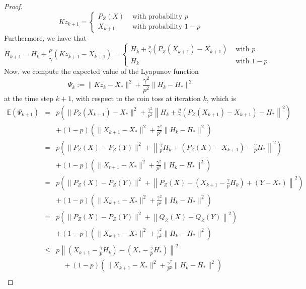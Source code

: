 \begin{itemize}
\begin{proof}
\begin{equation}
Kz_{k+1} = \left \{ \begin{array}{ll} P_Z(X) & \mbox{ with probability } p \\ X_{k+1} & \mbox{ with probability } 1 - p \end{array}  \right. 
\end{equation}
Furthermore, we have that 
\begin{equation}
H_{k+1} = H_k + \frac{p}{\gamma} (Kz_{k+1} - X_{k+1}) = 
\left \{ \begin{array}{ll} 
H_k + \frac{p}{\gamma} \left ( P_Z(X_{k+1}) - X_{k+1} \right ) & \mbox{ with  } p \\ H_k & \mbox{ with } 1 - p \end{array}  \right. 
\end{equation}
Now, we compute the expected value of the Lyapunov function 
\begin{equation}
\Psi_k := \|Kz_k - X_*\|^2 + \frac{\gamma^2}{p^2} \|H_k - H_*\|^2 
\end{equation}
at the time step $k+1$, with respect to the coin toss at iteration $k$, which is 
\begin{eqnarray}
\mathbb{E}(\Psi_{k+1}) &=& p \left ( \|P_Z(X_{k+1}) - X_*\|^2 + \frac{\gamma^2}{p^2} \left \|H_k + \frac{p}{\gamma} (P_Z(X_{k+1}) - X_{k+1})  - H_* \right \|^2 \right ) \\
&& + (1-p) \left ( \|X_{k+1} - X_*\|^2 + \frac{\gamma^2}{p^2} \|H_k - H_*\|^2  \right ) \\
&=& p \left ( \|P_Z(X) - P_Z(Y) \|^2 + \left \| \frac{\gamma}{p} H_k + (P_Z(X) - X_{k+1})  - \frac{\gamma}{p} H_* \right \|^2 \right ) \\
&& + (1-p) \left ( \|X_{t+1} - X_*\|^2 + \frac{\gamma^2}{p^2} \|H_k - H_*\|^2  \right ) \\
&=& p \left ( \|P_Z(X) - P_Z(Y) \|^2 + \left \|P_Z(X) - (X_{k+1} - \frac{\gamma}{p} H_k )  + (Y - X_*) \right \|^2 \right ) \\
&& + (1-p) \left ( \|X_{k+1} - X_*\|^2 + \frac{\gamma^2}{p^2} \|H_k - H_*\|^2  \right ) \\
&=& p \left ( \|P_Z(X) - P_Z(Y) \|^2 + \left \|Q_Z(X) - Q_Z(Y) \right \|^2 \right ) \\
&& + (1-p) \left ( \|X_{k+1} - X_*\|^2 + \frac{\gamma^2}{p^2} \|H_k - H_*\|^2  \right ) \\
&\leq& p \left \|\left ( X_{k+1} - \frac{\gamma}{p} H_k \right ) - \left ( X_* - \frac{\gamma}{p} H_* \right ) \right \|^2 \\
&& \quad + (1-p) \left ( \|X_{k+1} - X_*\|^2 + \frac{\gamma^2}{p^2} \|H_k - H_*\|^2  \right ) \\ 

\end{eqnarray}
\end{proof}
\end{itemize}
